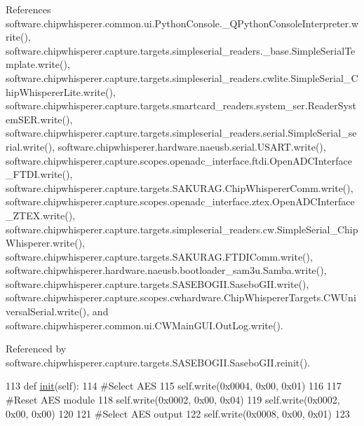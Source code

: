 References software.\+chipwhisperer.\+common.\+ui.\+Python\+Console.\+\_\+\+Q\+Python\+Console\+Interpreter.\+write(), software.\+chipwhisperer.\+capture.\+targets.\+simpleserial\+\_\+readers.\+\_\+base.\+Simple\+Serial\+Template.\+write(), software.\+chipwhisperer.\+capture.\+targets.\+simpleserial\+\_\+readers.\+cwlite.\+Simple\+Serial\+\_\+\+Chip\+Whisperer\+Lite.\+write(), software.\+chipwhisperer.\+capture.\+targets.\+smartcard\+\_\+readers.\+system\+\_\+ser.\+Reader\+System\+S\+E\+R.\+write(), software.\+chipwhisperer.\+capture.\+targets.\+simpleserial\+\_\+readers.\+serial.\+Simple\+Serial\+\_\+serial.\+write(), software.\+chipwhisperer.\+hardware.\+naeusb.\+serial.\+U\+S\+A\+R\+T.\+write(), software.\+chipwhisperer.\+capture.\+scopes.\+openadc\+\_\+interface.\+ftdi.\+Open\+A\+D\+C\+Interface\+\_\+\+F\+T\+D\+I.\+write(), software.\+chipwhisperer.\+capture.\+targets.\+S\+A\+K\+U\+R\+A\+G.\+Chip\+Whisperer\+Comm.\+write(), software.\+chipwhisperer.\+capture.\+scopes.\+openadc\+\_\+interface.\+ztex.\+Open\+A\+D\+C\+Interface\+\_\+\+Z\+T\+E\+X.\+write(), software.\+chipwhisperer.\+capture.\+targets.\+simpleserial\+\_\+readers.\+cw.\+Simple\+Serial\+\_\+\+Chip\+Whisperer.\+write(), software.\+chipwhisperer.\+capture.\+targets.\+S\+A\+K\+U\+R\+A\+G.\+F\+T\+D\+I\+Comm.\+write(), software.\+chipwhisperer.\+hardware.\+naeusb.\+bootloader\+\_\+sam3u.\+Samba.\+write(), software.\+chipwhisperer.\+capture.\+targets.\+S\+A\+S\+E\+B\+O\+G\+I\+I.\+Sasebo\+G\+I\+I.\+write(), software.\+chipwhisperer.\+capture.\+scopes.\+cwhardware.\+Chip\+Whisperer\+Targets.\+C\+W\+Universal\+Serial.\+write(), and software.\+chipwhisperer.\+common.\+ui.\+C\+W\+Main\+G\+U\+I.\+Out\+Log.\+write().



Referenced by software.\+chipwhisperer.\+capture.\+targets.\+S\+A\+S\+E\+B\+O\+G\+I\+I.\+Sasebo\+G\+I\+I.\+reinit().


\begin{DoxyCode}
113     \textcolor{keyword}{def }\hyperlink{classsoftware_1_1chipwhisperer_1_1capture_1_1targets_1_1SASEBOGII_1_1SaseboGIIAESRev1_ab02c6f9dfc086b07be2d3d0acc6bd33d}{init}(self):
114         \textcolor{comment}{#Select AES}
115         self.write(0x0004, 0x00, 0x01)
116 
117         \textcolor{comment}{#Reset AES module}
118         self.write(0x0002, 0x00, 0x04)
119         self.write(0x0002, 0x00, 0x00)
120 
121         \textcolor{comment}{#Select AES output}
122         self.write(0x0008, 0x00, 0x01)
123 
\end{DoxyCode}
\hypertarget{classsoftware_1_1chipwhisperer_1_1capture_1_1targets_1_1SASEBOGII_1_1SaseboGIIAESRev1_a044b6dda0a4741bb53454012aaae14ed}{}
